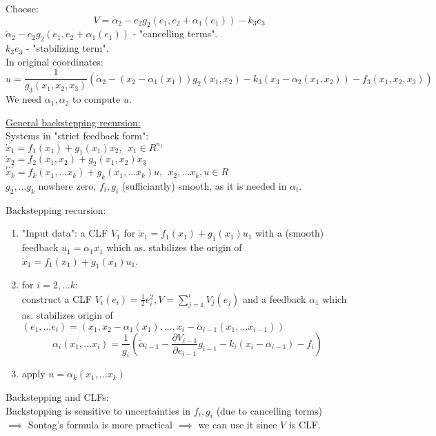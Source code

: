 Choose:
$$V = \dot \alpha_2 - e_2g_2(e_1,e_2+\alpha_1(e_1))-k_3e_3$$
$\dot \alpha_2 - e_2g_2(e_1,e_2+\alpha_1(e_1))$ - "cancelling terms".\\
$k_3e_3$ - "stabilizing term".\\

In original coordinates:\\
$$u=\frac{1}{g_3(x_1,x_2,x_3)}(\dot \alpha_2 - (x_2- \alpha_1(x_1))g_2(x_1,x_2)-k_3(x_3- \alpha_2(x_1,x_2))-f_3(x_1,x_2,x_3))$$
We need $\alpha_1, \alpha_2$ to compute $u$.

\underline{General backstepping recursion:}\\
Systems in "strict feedback form":\\
$\dot x_1 = f_1(x_1)+g_1(x_1)x_2, \ \ x_1 \in R^{n_1}$\\
$\dot x_2 = f_2(x_1,x_2)+g_2(x_1,x_2)x_3$\\
$\dots$\\
$\dot x_k = f_k(x_1,\dots x_k)+g_k(x_1,\dots x_k)u, \ \ x_2, \dots x_k, u \in R$\\
$g_2, \dots g_k$ nowhere zero, $f_i,g_i$ (sufficiantly) smooth, as it is needed in $\alpha_i$.

Backstepping recursion:
\begin{enumerate}
    \item "Input data": a CLF $V_1$ for $\dot x_1 = f_1(x_1)+g_1(x_1)u_1$ with a (smooth) feedback $u_1=\alpha_1x_1$ which as. stabilizes the origin of $\dot x_1 = f_1(x_1)+g_1(x_1)u_1$.
    \item for $i=2, \dots k$:\\
    construct a CLF $V_i(e_i)=\frac{1}{2}e_i^2, V = \sum \limits_{j=1}^iV_j(e_j)$ and a feedback $\alpha_1$ which as. stabilizes origin of $(e_1, \dots e_i) = (x_1,x_2-\alpha_1(x_1), \dots, x_i - \alpha_{i-1}(x_1, \dots x_{i-1}))$
    $$\alpha_i(x_1, \dots x_i) = \frac{1}{g_i}(\dot \alpha_{i-1} - \frac{\partial V_{i-1}}{\partial e_{i-1}}g_{i-1}-k_i(x_i-\alpha_{i-1})-f_i)$$
    \item apply $u=\alpha_k(x_1, \dots x_k)$
\end{enumerate}

Backstepping and CLFs:\\
Backstepping is sensitive to uncertainties in $f_i,g_i$ (due to cancelling terms)\\
$\implies$  Sontag's formula is more practical $\implies$ we can use it since $V$ is CLF. \\

